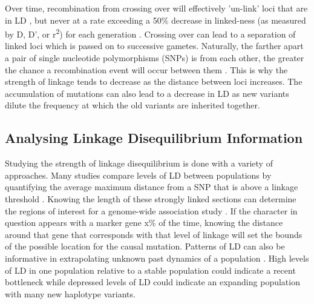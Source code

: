 \documentclass[11pt]{article}
\begin{document}
\begin{linenumbers}
Over time, recombination from crossing over will effectively 'un-link' loci that are in LD \citep{hartl1997principles, slatkin2008linkage}, but never at a rate exceeding a 50\% decrease in linked-ness (as measured by D, D', or r\textsuperscript2) for each generation \citep{weinberg1909vererbungsgesetze}. Crossing over can lead to a separation of linked loci which is passed on to successive gametes. Naturally, the farther apart a pair of single nucleotide polymorphisms (SNPs) is from each other, the greater the chance a recombination event will occur between them \citep{Park, 2012}. This is why the strength of linkage tends to decrease as the distance between loci increases. The accumulation of mutations can also lead to a decrease in LD as new variants dilute the frequency at which the old variants are inherited together.

\subsection{Analysing Linkage Disequilibrium Information}

Studying the strength of linkage disequilibrium is done with a variety of approaches. Many studies compare levels of LD between populations by quantifying the average maximum distance from a SNP that is above a linkage threshold \citep{reich2001linkage, gray2009linkage}. Knowing the length of these strongly linked sections can determine the regions of interest for a genome-wide association study \citep{reich2001linkage, mcrae2005modeling}. If the character in question appears with a marker gene x\% of the time, knowing the distance around that gene that corresponds with that level of linkage will set the bounds of the possible location for the causal mutation. Patterns of LD can also be informative in extrapolating unknown past dynamics of a population \citep{hill1981estimation, hernandez2007demographic, park2012linkage}. High levels of LD in one population relative to a stable population could indicate a recent bottleneck while depressed levels of LD could indicate an expanding population with many new haplotype variants. 


\end{linenumbers}
\end{document}
